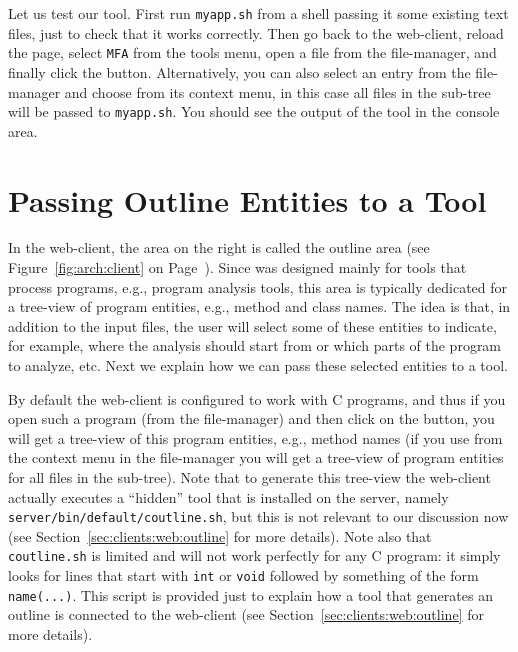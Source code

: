 Let us test our tool. First run \texttt{myapp.sh} from a shell
passing it some existing text files, just to check that it works
correctly.
%
Then go back to the web-client, reload the page, select \texttt{MFA}
from the tools menu, open a file from the file-manager, and finally
click the \applybutton button. Alternatively, you can also select an
entry from the file-manager and choose \applybutton from its context
menu, in this case all files in the sub-tree will be passed to
\texttt{myapp.sh}. You should see the output of the tool in the
console area.

\section{Passing Outline Entities to a Tool}
\label{sec:quickguide:outline}

In the web-client, the area on the right is called the outline area
(see Figure~\ref{fig:arch:client} on
Page~\pageref{fig:arch:client}).
%
Since \ei was designed mainly for tools that process programs, e.g.,
program analysis tools, this area is typically dedicated for a
tree-view of program entities, e.g., method and class names.
%
The idea is that, in addition to the input files, the user will select
some of these entities to indicate, for example, where the analysis
should start from or which parts of the program to analyze, etc.
%
Next we explain how we can pass these selected entities to a
tool.

By default the web-client is configured to work with C programs, and
thus if you open such a program (from the file-manager) and then click
on the  button, you will get a tree-view of this
program entities, e.g., method names (if you use  from
the context menu in the file-manager you will get a tree-view of
program entities for all files in the sub-tree).
%
Note that to generate this tree-view the web-client actually executes
a ``hidden'' tool that is installed on the server, namely
\texttt{server/bin/default/coutline.sh}, but this is not relevant to
our discussion now (see Section~\ref{sec:clients:web:outline} for more
details).
%
Note also that \texttt{coutline.sh} is limited and will not work
perfectly for any C program: it simply looks for lines that start with
\texttt{int} or \texttt{void} followed by something of the form
\texttt{name(...)}.
%
This script is provided just to explain how a tool that generates an
outline is connected to the web-client (see
Section~\ref{sec:clients:web:outline} for more details).

